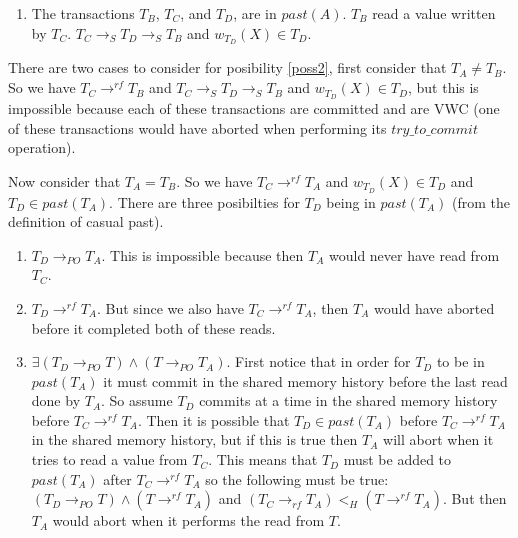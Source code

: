 \begin{proofT}
\begin{enumerate}
\item \label{poss2} The transactions $T_B$, $T_C$, and $T_D$, are in $past(A)$.
$T_B$ read a value written by $T_C$.
$T_C \rightarrow_S T_D \rightarrow_S T_B$ and $w_{T_D}(X) \in T_D$.

\end{enumerate}

There are two cases to consider for posibility \ref{poss2}, first consider that $T_A \neq T_B$.
So we have $T_C \rightarrow^{rf} T_B$ and $T_C \rightarrow_S T_D \rightarrow_S T_B$ and $w_{T_D}(X) \in T_D$, but this is impossible because each of these transactions are committed and are VWC (one of these transactions would have aborted when performing its $try\_to\_commit$ operation).

Now consider that $T_A = T_B$.
So we have $T_C \rightarrow^{rf} T_A$ and $w_{T_D}(X) \in T_D$ and $T_D \in past(T_A)$.
There are three posibilties for $T_D$ being in $past(T_A)$ (from the definition of casual past).

\begin{enumerate}

\item \label{pas1} $T_D \rightarrow_{PO} T_A$.  This is impossible because then $T_A$ would never have read from $T_C$.

\item \label{pas2} $T_D \rightarrow^{rf} T_A$.  But since we also have $T_C \rightarrow^{rf} T_A$, then $T_A$ would have aborted before it completed both of these reads.

\item \label{pas3} $\exists (T_D \rightarrow_{PO} T) \wedge (T \rightarrow_{PO} T_A)$.
First notice that in order for $T_D$ to be in $past(T_A)$ it must commit in the shared memory history before the last read done by $T_A$.
So assume $T_D$ commits at a time in the shared memory history before $T_C \rightarrow^{rf} T_A$.
Then it is possible that $T_D \in past(T_A)$ before $T_C \rightarrow^{rf} T_A$ in the shared memory history, but if this is true then $T_A$ will abort when it tries to read a value from $T_C$.
This means that $T_D$ must be added to $past(T_A)$ after $T_C \rightarrow^{rf} T_A$ so the following must be true:
$(T_D \rightarrow_{PO} T) \wedge (T \rightarrow^{rf} T_A)$ and $(T_C \rightarrow_{rf} T_A) <_H  (T \rightarrow^{rf} T_A)$.
But then $T_A$ would abort when it performs the read from $T$.

\end{enumerate}

\renewcommand{\toto}{vwcinvisperm} 
\end{proofT}

% 

